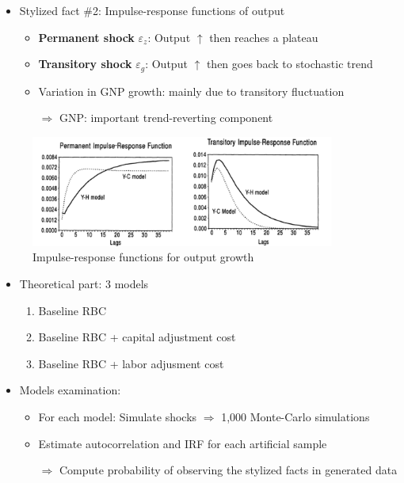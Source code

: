 \documentclass[10pt]{beamer}
\begin{document}
\begin{frame}
    \begin{itemize}
    \setlength\itemsep{1em}
        \item Stylized fact \#2: \alert{Impulse-response functions} of output
        \begin{itemize}
            \item \textbf{Permanent shock} $\varepsilon_z$: Output $\uparrow$ then reaches a plateau
            \item \textbf{Transitory shock} $\varepsilon_g$: Output $\uparrow$ then goes back to stochastic trend
            \item Variation in GNP growth: mainly due to transitory fluctuation
            \item[$\Rightarrow$] GNP: important \alert{trend-reverting component} 
        \end{itemize}    
    \end{itemize} 
    \begin{figure}
        \centering
        \includegraphics[width=10cm]{sf2.png}
        \caption{Impulse-response functions for output growth}
    \end{figure}
\end{frame}

\begin{frame}
    \begin{itemize}
    \setlength\itemsep{1em}
        \item \alert{Theoretical} part: 3 models
        \begin{enumerate}
            \item Baseline RBC
            \item Baseline RBC + capital adjustment cost
            \item Baseline RBC + labor adjusment cost
        \end{enumerate}
        \item Models examination:
            \begin{itemize}
                \item For each model: Simulate shocks $\Rightarrow$ 1,000 \alert{Monte-Carlo simulations} 
                \item Estimate autocorrelation and IRF for each artificial sample
                \item[$\Rightarrow$] Compute \alert{probability of observing the stylized facts} in generated data
            \end{itemize}
    \end{itemize}
\end{frame}
\end{document}

